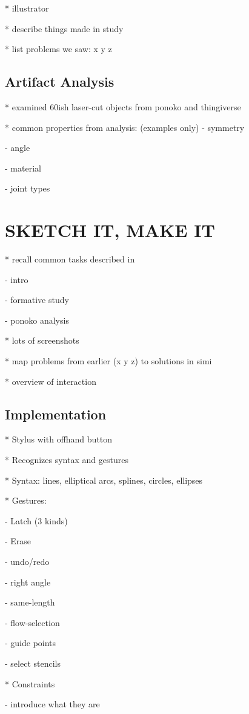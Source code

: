 \documentclass{article}
\begin{document}
* illustrator

* describe things made in study

* list problems we saw: x y z

\subsection{Artifact Analysis}

* examined 60ish laser-cut objects from ponoko and thingiverse

* common properties from analysis: (examples only)
  - symmetry

  - angle

  - material

  - joint types

\section{SKETCH IT, MAKE IT}

* recall common tasks described in

  - intro

  - formative study

  - ponoko analysis

* lots of screenshots

* map problems from earlier (x y z) to solutions in simi

* overview of interaction

\subsection{Implementation}

* Stylus with offhand button

* Recognizes syntax and gestures

* Syntax: lines, elliptical arcs, splines, circles, ellipses

* Gestures:

  - Latch (3 kinds) 

  - Erase 

  - undo/redo

  - right angle

  - same-length 

  - flow-selection

  - guide points

  - select stencils

* Constraints

  - introduce what they are
\end{document}
